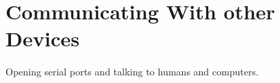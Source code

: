 \documentclass[11pt,a4paper]{article}
\begin{document}



\section{Communicating With other Devices} %
\label{sec:communicating_with_other_devices}

Opening serial ports and talking to humans and computers.


 
 \nocite{*}
\end{document}
